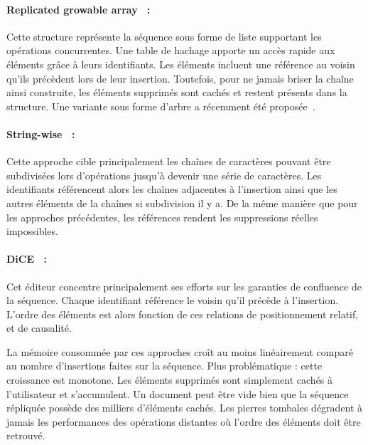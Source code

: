 \paragraph{Replicated growable array~\cite{roh2011replicated} :} Cette structure
représente la séquence sous forme de liste supportant les opérations
concurrentes. Une table de hachage apporte un accès rapide aux éléments grâce à
leurs identifiants. Les éléments incluent une référence au voisin qu'ils
précèdent lors de leur insertion. Toutefois, pour ne jamais briser la chaîne
ainsi construite, les éléments supprimés sont cachés et restent présents dans la
structure. Une variante sous forme d'arbre a récemment été
proposée~\cite{attiya2016specification}.

\paragraph{String-wise~\cite{yu2012stringwise} :} Cette approche cible
principalement les chaînes de caractères pouvant être subdivisées lors
d'opérations jusqu'à devenir une série de caractères. Les identifiants
référencent alors les chaînes adjacentes à l'insertion ainsi que les autres
éléments de la chaînes si subdivision il y a. De la même manière que pour les
approches précédentes, les références rendent les suppressions réelles
impossibles.

\paragraph{DiCE~\cite{conway2014language} :} Cet éditeur concentre
principalement ses efforts sur les garanties de confluence de la
séquence. Chaque identifiant référence le voisin qu'il précède à
l'insertion. L'ordre des éléments est alors fonction de ces relations de
positionnement relatif, et de causalité.


La mémoire consommée par ces approches croît au moins linéairement comparé au
nombre d'insertions faites sur la séquence. Plus problématique : cette
croissance est monotone. Les éléments supprimés sont simplement cachés à
l'utilisateur et s'accumulent. Un document peut être vide bien que la séquence
répliquée possède des milliers d'éléments cachés.  Les pierres tombales
dégradent à jamais les performances des opérations distantes où l'ordre des
éléments doit être retrouvé.

